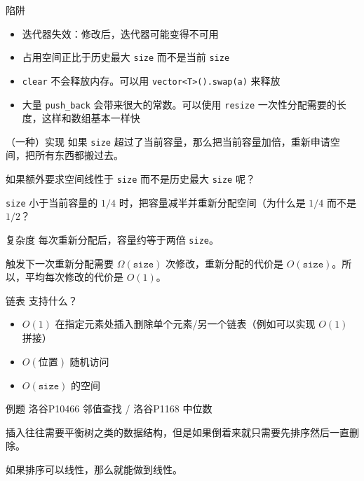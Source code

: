 \documentclass[11pt,aspectratio=169]{beamer}
\begin{document}
\begin{frame}{陷阱}
\begin{itemize}
    \item 迭代器失效：修改后，迭代器可能变得不可用
    \item 占用空间正比于历史最大 \texttt{size} 而不是当前 \texttt{size}
    \item \texttt{clear} 不会释放内存。可以用 \texttt{vector<T>().swap(a)} 来释放 
    \item 大量 \texttt{push\_back} 会带来很大的常数。可以使用 \texttt{resize} 一次性分配需要的长度，这样和数组基本一样快
\end{itemize}
\end{frame}

\begin{frame}{（一种）实现}
   如果 \texttt{size} 超过了当前容量，那么把当前容量加倍，重新申请空间，把所有东西都搬过去。
   
   如果额外要求空间线性于 \texttt{size} 而不是历史最大 \texttt{size} 呢？

   \texttt{size} 小于当前容量的 $1/4$ 时，把容量减半并重新分配空间（为什么是 $1/4$ 而不是 $1/2$？
\end{frame}

\begin{frame}{复杂度}
    每次重新分配后，容量约等于两倍 \texttt{size}。

    触发下一次重新分配需要 $\Omega(\mathtt{size})$ 次修改，重新分配的代价是 $O(\mathtt{size})$。所以，平均每次修改的代价是 $O(1)$。
\end{frame}

\begin{frame}{链表}
    支持什么？

    \begin{itemize}
        \item $O(1)$ 在指定元素处插入删除单个元素/另一个链表（例如可以实现 $O(1)$ 拼接）
        \item $O(\text{位置})$ 随机访问
        \item $O(\mathtt{size})$ 的空间
    \end{itemize}
\end{frame}

\begin{frame}{例题}
    洛谷P10466 邻值查找 / 洛谷P1168 中位数

    插入往往需要平衡树之类的数据结构，但是如果倒着来就只需要先排序然后一直删除。
    
    如果排序可以线性，那么就能做到线性。
\end{frame}
\end{document}
